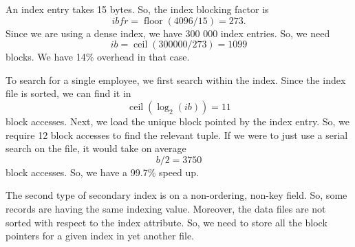\documentclass[a4paper, openany]{memoir}
\begin{document}
An index entry takes 15 bytes. So, the index blocking factor is
\[\textit{ibfr} = \operatorname{floor}(4096/15) = 273.\]
Since we are using a dense index, we have 300 000 index entries. So, we need
\[\textit{ib} = \operatorname{ceil}(300000/273) = 1099\]
blocks. We have 14\% overhead in that case.

To search for a single employee, we first search within the index. Since the index file is sorted, we can find it in
\[\operatorname{ceil}(\log_2(\textit{ib})) = 11\]
block accesses. Next, we load the unique block pointed by the index entry. So, we require 12 block accesses to find the relevant tuple. If we were to just use a serial search on the file, it would take on average 
\[b/2 = 3750\]
block accesses. So, we have a 99.7\% speed up. 

The second type of secondary index is on a non-ordering, non-key field. So, some records are having the same indexing value. Moreover, the data files are not sorted with respect to the index attribute. So, we need to store all the block pointers for a given index in yet another file. 
\end{document}
